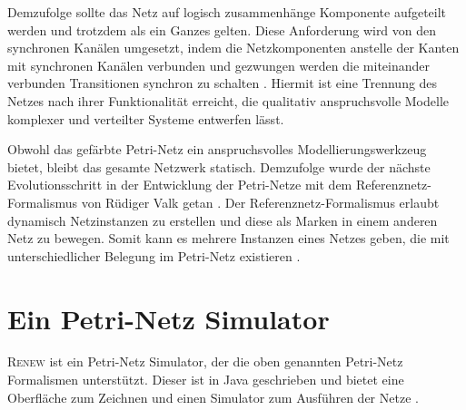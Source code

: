 	Demzufolge sollte das Netz auf logisch zusammenhänge Komponente aufgeteilt werden und trotzdem als ein Ganzes gelten. Diese Anforderung wird von den synchronen Kanälen umgesetzt, indem die Netzkomponenten anstelle der Kanten mit synchronen Kanälen verbunden und gezwungen werden die miteinander verbunden Transitionen synchron zu schalten \cite{Kummer02}. Hiermit ist eine Trennung des Netzes nach ihrer Funktionalität erreicht, die qualitativ anspruchsvolle Modelle komplexer und verteilter Systeme entwerfen lässt.\bigbreak

	Obwohl das gefärbte Petri-Netz ein anspruchsvolles Modellierungswerkzeug bietet, bleibt das gesamte Netzwerk statisch. Demzufolge wurde der nächste Evolutionsschritt in der Entwicklung der Petri-Netze mit dem Referenznetz-Formalismus von Rüdiger Valk getan \cite{Valk09}. Der Referenznetz-Formalismus erlaubt dynamisch Netzinstanzen zu erstellen und diese als Marken in einem anderen Netz zu bewegen. Somit kann es mehrere Instanzen eines Netzes geben, die mit unterschiedlicher Belegung im Petri-Netz existieren \cite{Kummer02}.

\section{Ein Petri-Netz Simulator} \label{sec:EPS}

	\textsc{Renew} ist ein Petri-Netz Simulator, der die oben genannten Petri-Netz Formalismen unterstützt. Dieser ist in Java geschrieben und bietet eine Oberfläche zum Zeichnen und einen Simulator zum Ausführen der Netze \cite{Kummer+99a}.\bigbreak

